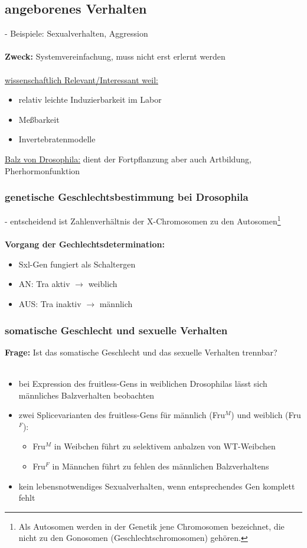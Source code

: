 \subsection{angeborenes Verhalten}
 - Beispiele: Sexualverhalten, Aggression
\\\\
\textbf{Zweck:} Systemvereinfachung, muss nicht erst erlernt werden
\\\\
\underline{wissenschaftlich Relevant/Interessant weil:}
\begin{itemize}
	\item relativ leichte Induzierbarkeit im Labor
	\item Meßbarkeit
	\item Invertebratenmodelle
\end{itemize}

\underline{Balz von Drosophila:} dient der Fortpflanzung aber auch Artbildung, Pherhormonfunktion

\subsubsection{genetische Geschlechtsbestimmung bei Drosophila}
 - entscheidend ist Zahlenverhältnis der X-Chromosomen zu den Autosomen\footnote{Als Autosomen werden in der Genetik jene Chromosomen bezeichnet, die nicht zu den Gonosomen (Geschlechtschromosomen) gehören.}
\\\\
\textbf{Vorgang der Gechlechtsdetermination:}
\begin{itemize}
	\item Sxl-Gen fungiert als Schaltergen
	\item AN: Tra aktiv $\rightarrow$ weiblich
	\item AUS: Tra inaktiv $\rightarrow$ männlich
\end{itemize}

\subsubsection{somatische Geschlecht und sexuelle Verhalten}
\textbf{Frage:} Ist das somatische Geschlecht und das sexuelle Verhalten trennbar?\\\\
\begin{itemize}
	\item bei Expression des fruitless-Gens in weiblichen Drosophilas lässt sich männliches Balzverhalten beobachten
	\item zwei Splicevarianten des fruitless-Gens für männlich (Fru$^M$) und weiblich (Fru$^F$):
	\begin{itemize}
		\item Fru$^M$ in Weibchen führt zu selektivem anbalzen von WT-Weibchen
		\item Fru$^F$ in Männchen führt zu fehlen des männlichen Balzverhaltens
	\end{itemize}
	\item kein lebensnotwendiges Sexualverhalten, wenn entsprechendes Gen komplett fehlt
\end{itemize}

